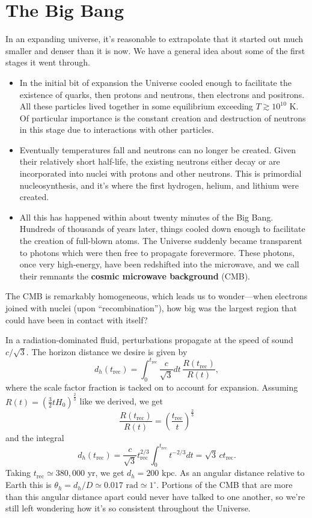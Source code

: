 \documentclass[../a062main.tex]{subfiles}
\begin{document}
\section{The Big Bang}
In an expanding universe, it's reasonable to extrapolate that it started out much smaller and denser than it is now.
We have a general idea about some of the first stages it went through.
\begin{itemize}
    \item In the initial bit of expansion the Universe cooled enough to facilitate the existence of quarks, then protons and neutrons, then electrons and positrons.
    All these particles lived together in some equilibrium exceeding $T \gtrsim 10^{10} \textrm{ K}$.
    Of particular importance is the constant creation and destruction of neutrons in this stage due to interactions with other particles.

    \item Eventually temperatures fall and neutrons can no longer be created.
    Given their relatively short half-life, the existing neutrons either decay or are incorporated into nuclei with protons and other neutrons.
    This is primordial nucleosynthesis, and it's where the first hydrogen, helium, and lithium were created.

    \item All this has happened within about twenty minutes of the Big Bang.
    Hundreds of thousands of years later, things cooled down enough to facilitate the creation of full-blown atoms.
    The Universe suddenly became transparent to photons which were then free to propagate forevermore.
    These photons, once very high-energy, have been redshifted into the microwave, and we call their remnants the \textbf{cosmic microwave background} (CMB).
\end{itemize}
The CMB is remarkably homogeneous, which leads us to wonder---when electrons joined with nuclei (upon ``recombination''), how big was the largest region that could have been in contact with itself?

In a radiation-dominated fluid, perturbations propagate at the speed of sound $c / \sqrt{3}$.
The horizon distance we desire is given by
\[ d_h(t_\textrm{rec}) = \int_{0}^{t_\textrm{rec}} \frac{c}{\sqrt{3}} dt\, \frac{R(t_\textrm{rec})}{R(t)}, \]
where the scale factor fraction is tacked on to account for expansion.
Assuming $R(t) = \left( \frac{3}{2} t H_0 \right)^{\frac{2}{3}}$ like we derived, we get
\[ \frac{R(t_\textrm{rec})}{R(t)} = \left( \frac{t_\textrm{rec}}{t} \right)^{\frac{2}{3}} \]
and the integral
\[ d_h(t_\text{rec}) = \frac{c}{\sqrt{3}} t_\text{rec}^{2 / 3} \int_{0}^{t_\text{rec}} t^{-2 / 3}dt = \sqrt{3} \,c t_\text{rec}. \]
Taking $t_\textrm{rec} \simeq 380,000 \text{ yr}$, we get $d_h = 200 \textrm{ kpc}$.
As an angular distance relative to Earth this is $\theta_h = d_h / D \simeq 0.017 \textrm{ rad} \simeq 1^\circ$.
Portions of the CMB that are more than this angular distance apart could never have talked to one another, so we're still left wondering how it's so consistent throughout the Universe.
\end{document}
